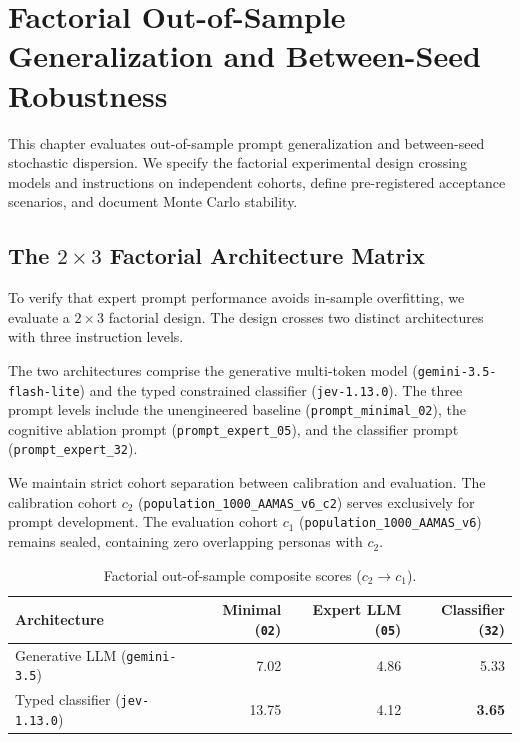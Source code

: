 \section{Factorial Out-of-Sample Generalization and Between-Seed Robustness}
\label{app-factorial}

This chapter evaluates out-of-sample prompt generalization and between-seed stochastic dispersion. We specify the factorial experimental design crossing models and instructions on independent cohorts, define pre-registered acceptance scenarios, and document Monte Carlo stability.

\subsection{The $2 \times 3$ Factorial Architecture Matrix}

To verify that expert prompt performance avoids in-sample overfitting, we evaluate a $2 \times 3$ factorial design. The design crosses two distinct architectures with three instruction levels.

The two architectures comprise the generative multi-token model (\texttt{gemini-3.5-flash-lite}) and the typed constrained classifier (\texttt{jev-1.13.0}). The three prompt levels include the unengineered baseline (\texttt{prompt\_minimal\_02}), the cognitive ablation prompt (\texttt{prompt\_expert\_05}), and the classifier prompt (\texttt{prompt\_expert\_32}).

We maintain strict cohort separation between calibration and evaluation. The calibration cohort $c_2$ (\texttt{population\_1000\_AAMAS\_v6\_c2}) serves exclusively for prompt development. The evaluation cohort $c_1$ (\texttt{population\_1000\_AAMAS\_v6}) remains sealed, containing zero overlapping personas with $c_2$.

\begin{table}[tbp]
  \caption{Factorial out-of-sample composite scores ($c_2 \rightarrow c_1$).}
  \label{tab-factorial-out}
  \begin{tabular}{lrrr}
    \toprule
    Architecture & Minimal (\texttt{02}) & Expert LLM (\texttt{05}) & Classifier (\texttt{32}) \\
    \midrule
    Generative LLM (\texttt{gemini-3.5})   & 7.02  & 4.86 & 5.33 \\
    Typed classifier (\texttt{jev-1.13.0}) & 13.75 & 4.12 & \textbf{3.65} \\
    \bottomrule
  \end{tabular}
\end{table}

